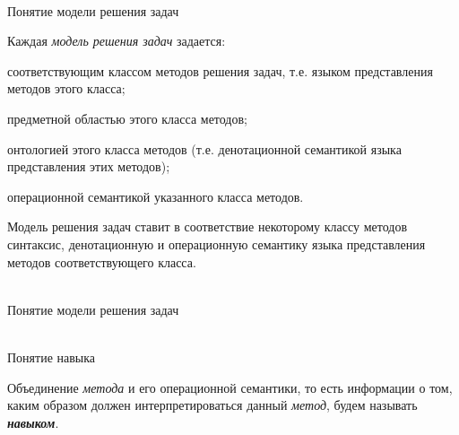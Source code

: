 \begin{frame}{\\Понятие модели решения задач}
	\topline
	\justifying
    \vspace{0.33cm}
    
    Каждая \textit{модель решения задач} задается:
    \begin{textitemize}
    	\item соответствующим классом методов решения задач, т.е. языком представления методов этого класса;
    	\item предметной областью этого класса методов; 
    	\item онтологией этого класса методов (т.е. денотационной семантикой языка представления этих методов);
    	\item операционной семантикой указанного класса методов.
    \end{textitemize}
    Модель решения задач ставит в соответствие некоторому классу методов синтаксис, денотационную и операционную семантику языка представления методов соответствующего класса.
\end{frame}

\begin{frame}{\\Понятие модели решения задач}
	\topline
	\justifying
    \begin{SCn}
    \end{SCn}
\end{frame}

\begin{frame}{\\Понятие навыка}
	\topline
	\justifying
	
	Объединение \textit{метода} и его операционной семантики, то есть информации о том, каким образом должен интерпретироваться данный \textit{метод}, будем называть \textbf{\textit{навыком}}.
	
    \begin{SCn}
    \end{SCn}
\end{frame}

